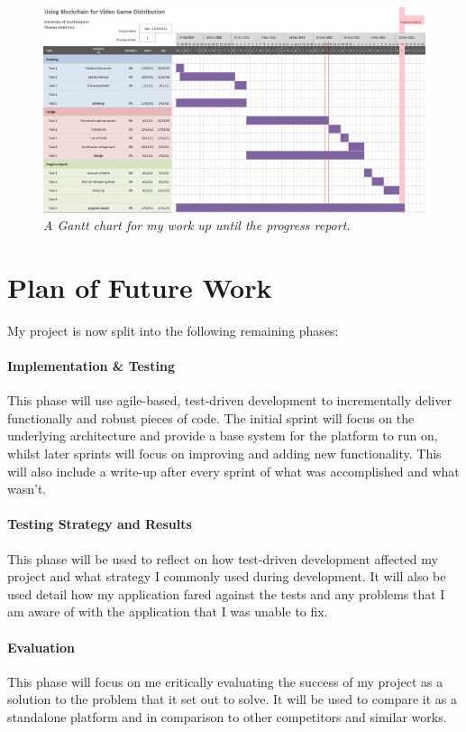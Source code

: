 \begin{figure}[ht]
  \includegraphics[width=\textwidth]{diagrams/gantt-chart-1.png}
  \caption{\textit{A Gantt chart for my work up until the progress report.}}
\end{figure}

\section{Plan of Future Work}

My project is now split into the following remaining phases:

\paragraph{Implementation \& Testing}
This phase will use agile-based, test-driven development to incrementally deliver functionally and robust pieces of code. The initial sprint will focus on the underlying architecture and provide a base system for the platform to run on, whilst later sprints will focus on improving and adding new functionality. This will also include a write-up after every sprint of what was accomplished and what wasn't.

\paragraph{Testing Strategy and Results}
This phase will be used to reflect on how test-driven development affected my project and what strategy I commonly used during development. It will also be used detail how my application fared against the tests and any problems that I am aware of with the application that I was unable to fix.

\paragraph{Evaluation}
This phase will focus on me critically evaluating the success of my project as a solution to the problem that it set out to solve. It will be used to compare it as a standalone platform and in comparison to other competitors and similar works.